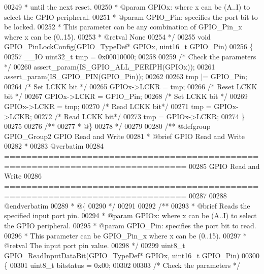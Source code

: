 \begin{DoxyCode}
00249 \textcolor{comment}{  *         until the next reset.}
00250 \textcolor{comment}{  * @param  GPIOx: where x can be (A..I) to select the GPIO peripheral.}
00251 \textcolor{comment}{  * @param  GPIO\_Pin: specifies the port bit to be locked.}
00252 \textcolor{comment}{  *          This parameter can be any combination of GPIO\_Pin\_x where x can be (0..15).}
00253 \textcolor{comment}{  * @retval None}
00254 \textcolor{comment}{  */}
00255 \textcolor{keywordtype}{void} GPIO_PinLockConfig(GPIO\_TypeDef* GPIOx, uint16\_t GPIO\_Pin)
00256 \{
00257   \_\_IO uint32\_t tmp = 0x00010000;
00258 
00259   \textcolor{comment}{/* Check the parameters */}
00260   assert_param(IS\_GPIO\_ALL\_PERIPH(GPIOx));
00261   assert_param(IS\_GPIO\_PIN(GPIO\_Pin));
00262 
00263   tmp |= GPIO\_Pin;
00264   \textcolor{comment}{/* Set LCKK bit */}
00265   GPIOx->LCKR = tmp;
00266   \textcolor{comment}{/* Reset LCKK bit */}
00267   GPIOx->LCKR =  GPIO\_Pin;
00268   \textcolor{comment}{/* Set LCKK bit */}
00269   GPIOx->LCKR = tmp;
00270   \textcolor{comment}{/* Read LCKK bit*/}
00271   tmp = GPIOx->LCKR;
00272   \textcolor{comment}{/* Read LCKK bit*/}
00273   tmp = GPIOx->LCKR;
00274 \}
00275 
00276 \textcolor{comment}{/**}
00277 \textcolor{comment}{  * @\}}
00278 \textcolor{comment}{  */}
00279 
00280 \textcolor{comment}{/** @defgroup GPIO\_Group2 GPIO Read and Write}
00281 \textcolor{comment}{ *  @brief   GPIO Read and Write}
00282 \textcolor{comment}{ *}
00283 \textcolor{comment}{@verbatim   }
00284 \textcolor{comment}{ ===============================================================================}
00285 \textcolor{comment}{                              GPIO Read and Write}
00286 \textcolor{comment}{ ===============================================================================  }
00287 \textcolor{comment}{}
00288 \textcolor{comment}{@endverbatim}
00289 \textcolor{comment}{  * @\{}
00290 \textcolor{comment}{  */}
00291 
00292 \textcolor{comment}{/**}
00293 \textcolor{comment}{  * @brief  Reads the specified input port pin.}
00294 \textcolor{comment}{  * @param  GPIOx: where x can be (A..I) to select the GPIO peripheral.}
00295 \textcolor{comment}{  * @param  GPIO\_Pin: specifies the port bit to read.}
00296 \textcolor{comment}{  *         This parameter can be GPIO\_Pin\_x where x can be (0..15).}
00297 \textcolor{comment}{  * @retval The input port pin value.}
00298 \textcolor{comment}{  */}
00299 uint8\_t GPIO_ReadInputDataBit(GPIO\_TypeDef* GPIOx, uint16\_t GPIO\_Pin)
00300 \{
00301   uint8\_t bitstatus = 0x00;
00302 
00303   \textcolor{comment}{/* Check the parameters */}

\end{DoxyCode}
